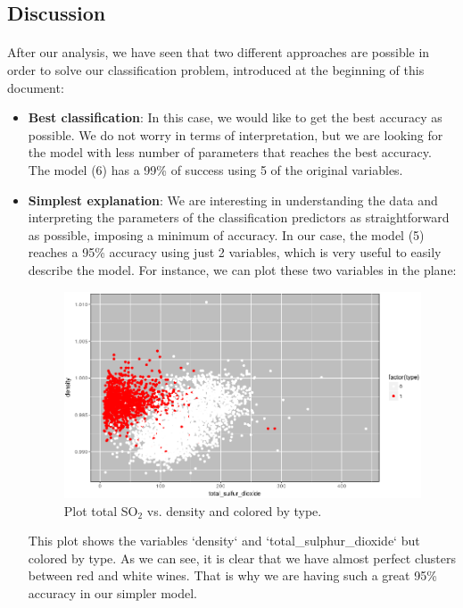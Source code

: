 \documentclass[10pt]{article}
\begin{document}
\subsection{Discussion}

\paragraph*{}
After our analysis, we have seen that two different approaches are possible in order to solve our classification problem, introduced at the beginning of this document:

\begin{itemize}
	\item \textbf{Best classification}: In this case, we would like to get the best accuracy as possible. We do not worry in terms of interpretation, but we are looking for the model with less number of parameters that reaches the best accuracy. The model (6) has a 99\% of success using 5 of the original variables. 
	\item \textbf{Simplest explanation}: We are interesting in understanding the data and interpreting the parameters of the classification predictors as straightforward as possible, imposing a minimum of accuracy. In our case, the model (5) reaches a 95\% accuracy using just 2 variables, which is very useful to easily describe the model. For instance, we can plot these two variables in the plane:
	
	\begin{figure}[H]
		\centering
		\includegraphics[width=5in]{figures/cluster.png} 
		\caption{Plot total SO$_2$ vs. density and colored by type.}
		\label{figure:cluster}
	\end{figure}
	
	This plot shows the variables `density` and `total\_sulphur\_dioxide` but colored by type. As we can see, it is clear that we have almost perfect clusters between red and white wines. That is why we are having such a great 95\% accuracy in our simpler model. 
\end{itemize}
\end{document}
